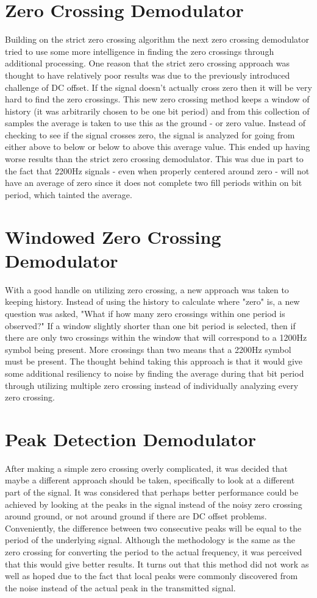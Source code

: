 \section{Zero Crossing Demodulator}
Building on the strict zero crossing algorithm the next zero crossing demodulator tried to use some more intelligence in finding the zero crossings through additional processing. One reason that the strict zero crossing approach was thought to have relatively poor results was due to the previously introduced challenge of DC offset. If the signal doesn't actually cross zero then it will be very hard to find the zero crossings. This new zero crossing method keeps a window of history (it was arbitrarily chosen to be one bit period) and from this collection of samples the average is taken to use this as the ground - or zero value. Instead of checking to see if the signal crosses zero, the signal is analyzed for going from either above to below or below to above this average value. This ended up having worse results than the strict zero crossing demodulator. This was due in part to the fact that 2200Hz signals - even when properly centered around zero - will not have an average of zero since it does not complete two fill periods within on bit period, which tainted the average.

\section{Windowed Zero Crossing Demodulator}
With a good handle on utilizing zero crossing, a new approach was taken to keeping history. Instead of using the history to calculate where "zero" is, a new question was asked, "What if how many zero crossings within one period is observed?" If a window slightly shorter than one bit period is selected, then if there are only two crossings within the window that will correspond to a 1200Hz symbol being present. More crossings than two means that a 2200Hz symbol must be present. The thought behind taking this approach is that it would give some additional resiliency to noise by finding the average during that bit period through utilizing multiple zero crossing instead of individually analyzing every zero crossing. 

\section{Peak Detection Demodulator}
After making a simple zero crossing overly complicated, it was decided that maybe a different approach should be taken, specifically to look at a different part of the signal. It was considered that perhaps better performance could be achieved by looking at the peaks in the signal instead of the noisy zero crossing around ground, or not around ground if there are DC offset problems. Conveniently, the difference between two consecutive peaks will be equal to the period of the underlying signal. Although the methodology is the same as the zero crossing for converting the period to the actual frequency, it was perceived that this would give better results. It turns out that this method did not work as well as hoped due to the fact that local peaks were commonly discovered from the noise instead of the actual peak in the transmitted signal.

